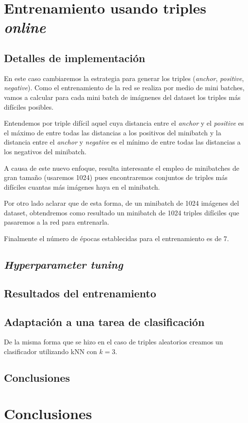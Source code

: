 \documentclass[11pt]{article}
\begin{document}
\pagebreak

\section{Entrenamiento usando triples \emph{online}}

\subsection{Detalles de implementación}

En este caso cambiaremos la estrategia para generar los triples (\emph{anchor}, \emph{positive}, \emph{negative}). Como el entrenamiento de la red se realiza por medio de mini batches, vamos a calcular para cada mini batch de imágnenes del dataset los triples más difíciles posibles. 

Entendemos por triple difícil aquel cuya distancia entre el \emph{anchor} y el \emph{positive} es el máximo de entre todas las distancias a los positivos del minibatch y la distancia entre el \emph{anchor} y \emph{negative} es el mínimo de entre todas las distancias a los negativos del minibatch.

A causa de este nuevo enfoque, resulta interesante el empleo de minibatches de gran tamaño (usaremos 1024) pues encontraremos conjuntos de triples más difíciles cuantas más imágenes haya en el minibatch.

Por otro lado aclarar que de esta forma, de un minibatch de 1024 imágenes del dataset, obtendremos como resultado un minibatch de 1024 triples difíciles que pasaremos a la red para entrenarla.

Finalmente el número de épocas establecidas para el entrenamiento es de 7.

\subsection{\emph{Hyperparameter tuning}} \label{hyperparameter_tuning:seccion}

\subsection{Resultados del entrenamiento}

\subsection{Adaptación a una tarea de clasificación}

De la misma forma que se hizo en el caso de triples aleatorios creamos un clasificador utilizando kNN con $k = 3$.

\subsection{Conclusiones}


\pagebreak

\section{Conclusiones}

\pagebreak



\end{document}
